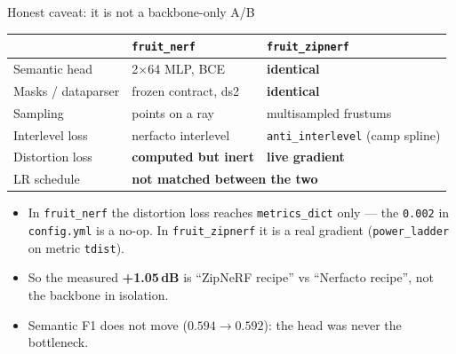\documentclass[aspectratio=169,11pt]{beamer}
\newcommand{\zn}{\textcolor{zipblue}{\texttt{fruit\_zipnerf}}}
\newcommand{\fn}{\textcolor{fnorange}{\texttt{fruit\_nerf}}}
\begin{document}
\begin{frame}{Honest caveat: it is not a backbone-only A/B}

  \begin{center}
  \small
  \begin{tabular}{lll}
    \toprule
      & \fn & \zn \\
    \midrule
    Semantic head        & 2$\times$64 MLP, BCE       & \textbf{identical} \\
    Masks / dataparser   & frozen contract, ds2       & \textbf{identical} \\
    Sampling             & points on a ray            & multisampled frustums \\
    Interlevel loss      & nerfacto interlevel        & \texttt{anti\_interlevel} (camp spline) \\
    \textcolor{fnorange}{Distortion loss}
                         & \textcolor{fnorange}{\textbf{computed but inert}}
                         & \textcolor{zipblue}{\textbf{live gradient}} \\
    \textcolor{fnorange}{LR schedule}
                         & \multicolumn{2}{l}{\textcolor{fnorange}{\textbf{not matched between the two}}} \\
    \bottomrule
  \end{tabular}
  \end{center}

  \vspace{0.9em}
  \begin{itemize}
    \item In \fn{} the distortion loss reaches \texttt{metrics\_dict} only --- the
          \texttt{0.002} in \texttt{config.yml} is a no-op. In \zn{} it is a real
          gradient (\texttt{power\_ladder} on metric \texttt{tdist}).
    \item So the measured \textbf{+1.05\,dB} is ``ZipNeRF recipe'' vs
          ``Nerfacto recipe'', not the backbone in isolation.
    \item Semantic F1 does not move ($0.594 \to 0.592$): the head was never the
          bottleneck.
  \end{itemize}
\end{frame}
\end{document}
